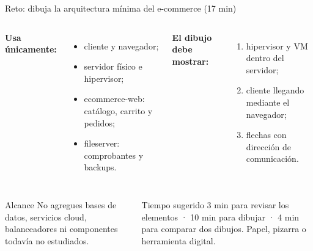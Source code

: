 \documentclass[aspectratio=169,10pt,c]{beamer}
\begin{document}
\begin{frame}{Reto: dibuja la arquitectura mínima del e-commerce \textnormal{\small(17 min)}}
\begin{columns}[T,onlytextwidth]
\textbf{\small Usa únicamente:}
\begin{itemize}\setlength\itemsep{3pt}\small
  \item cliente y navegador;
  \item servidor físico e hipervisor;
  \item ecommerce-web: catálogo, carrito y pedidos;
  \item fileserver: comprobantes y backups.
\end{itemize}
\textbf{\small El dibujo debe mostrar:}
\begin{enumerate}\setlength\itemsep{3pt}\small
  \item hipervisor y VM dentro del servidor;
  \item cliente llegando mediante el navegador;
  \item flechas con dirección de comunicación.
\end{enumerate}
\end{columns}
\vspace{0.2cm}
\begin{columns}[T,onlytextwidth]
\begin{alertblock}{Alcance}
\small No agregues bases de datos, servicios cloud, balanceadores ni componentes todavía no estudiados.
\end{alertblock}
\begin{exampleblock}{Tiempo sugerido}
\small 3 min para revisar los elementos · 10 min para dibujar · 4 min para comparar dos dibujos. Papel, pizarra o herramienta digital.
\end{exampleblock}
\end{columns}
\end{frame}
\end{document}
